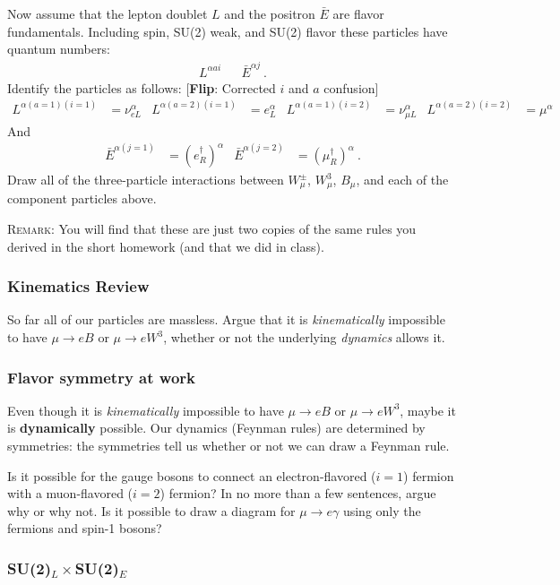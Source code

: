 \documentclass[12pt]{article}
\newcommand{\flip}[1]{{\color{red} [\textbf{Flip}: {#1}]}}
\begin{document}
Now assume that the lepton doublet $L$ and the positron $\bar E$ are flavor fundamentals. Including spin, SU(2) weak, and SU(2) flavor these particles have quantum numbers:
\begin{align}
	L^{\alpha a i} && \bar E^{\alpha j} \ .
\end{align}
Identify the particles as follows: \flip{Corrected $i$ and $a$ confusion}
\begin{align}
	L^{\alpha(a=1)(i=1)} &= \nu_{eL}^\alpha
	&
	L^{\alpha(a=2)(i=1)} &= e_L^\alpha
	&
	L^{\alpha(a=1)(i=2)} &= \nu_{\mu L}^\alpha
	&
	L^{\alpha(a=2)(i=2)} &= \mu^\alpha
\end{align}
And
\begin{align}
	\bar E^{\alpha(j=1)} &= \left(e_R^\dag\right)^\alpha
	&
	\bar E^{\alpha(j=2)} &= \left(\mu_R^\dag\right)^\alpha \ .
\end{align}
Draw all of the three-particle interactions between $W^\pm_\mu$, $W^3_\mu$, $B_\mu$, and each of the component particles above. 

\textsc{Remark}: You will find that these are just two copies of the same rules you derived in the short homework (and that we did in class). 

\subsubsection{Kinematics Review}

So far all of our particles are massless. Argue that it is \emph{kinematically} impossible to have $\mu \to e B$ or $\mu \to e W^3$, whether or not the underlying \emph{dynamics} allows it.

\subsubsection{Flavor symmetry at work}

Even though it is \emph{kinematically} impossible to have $\mu \to e B$ or $\mu \to e W^3$, maybe it is \textbf{dynamically} possible. Our dynamics (Feynman rules) are determined by symmetries: the symmetries tell us whether or not we can draw a Feynman rule.

Is it possible for the gauge bosons to connect an electron-flavored ($i=1$) fermion with a muon-flavored ($i=2$) fermion? In no more than a few sentences, argue why or why not. Is it possible to draw a diagram for $\mu \to e \gamma$ using only the fermions and spin-1 bosons?


\subsubsection{SU(2)$_L\times$SU(2)$_E$}
\end{document}
